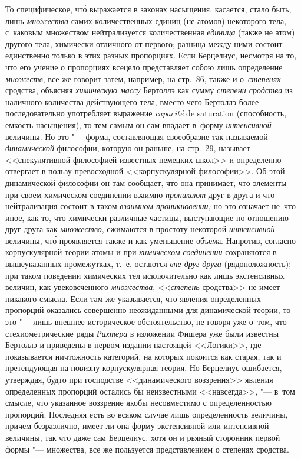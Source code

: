 То специфическое, чт\'{о} выражается в законах насыщения, касается, стало быть,
лишь {\em множества} самих количественных единиц (не атомов) некоторого тела,
с~каковым множеством нейтрализуется количественная {\em единица} (также не
атом) другого тела, химически отличного от первого; разница между ними состоит
единственно только в этих разных пропорциях. Если Берцелиус, несмотря на то,
что его учение о пропорциях всецело представляет собою лишь определение
{\em множеств}, все же говорит затем, например, на стр.~86, также и
о~{\em степенях} сродства, объясняя {\em химическую массу} Бертоллэ как сумму
{\em степени сродства} из наличного количества действующего тела, вместо чего
Бертоллэ более последовательно употребляет выражение {\em capa\-cité} de
satura\-tion (способность, емкость насыщения), то тем самым он сам впадает
в~форму {\em интенсивной} величины. Но это "--- форма, составляющая своеобразие
так называемой {\em динамической} философии, которую он раньше, на стр.~29,
называет <<спекулятивной философией известных немецких школ>> и определенно
отвергает в пользу превосходной <<корпускулярной философии>>. Об этой
динамической философии он там сообщает, что она принимает, что элементы при
своем химическом соединении взаимно {\em проникают} друг в друга и что
нейтрализация состоит в таком {\em взаимном проникновении;} но это означает
не~что иное, как то, что химически различные частицы, выступающие по отношению
друг друга как {\em множество}, сжимаются в простоту некоторой
{\em интенсивной} величины, чт\'{о} проявляется также и как уменьшение объема.
Напротив, согласно корпускулярной теории атомы и при
{\em химическом соединении} сохраняются в вышеуказанных промежутках, т.~е.
остаются {\em вне друг друга} (рядоположность); при таком поведении химических
тел исключительно как лишь экстенсивных величин, как увековеченного
{\em множества}, <<{\em степень} сродства>> не имеет никакого смысла. Если там
же указывается, что явления определенных пропорций оказались совершенно
неожиданными для динамической теории, то это "--- лишь внешнее историческое
обстоятельство, не говоря уже о~том, что стехиометрические ряды {\em Рихтера}
в изложении Фишера уже были известны Бертоллэ и приведены в первом издании
настоящей <<Логики>>, где показывается ничтожность категорий, на которых
покоится как старая, так и претендующая на новизну корпускулярная теория.
Но Берцелиус ошибается, утверждая, будто при господстве <<динамического
воззрения>> явления определенных пропорций остались бы неизвестными
<<навсегда>>, "--- в~том смысле, что указанное воззрение якобы несовместимо с
определенностью пропорций. Последняя есть во всяком случае лишь определенность
величины, причем безразлично, имеет ли она форму экстенсивной или интенсивной
величины, так что даже сам Берцелиус, хотя он и рьяный сторонник первой формы
"--- множества, все же пользуется представлением о степенях сродства.

